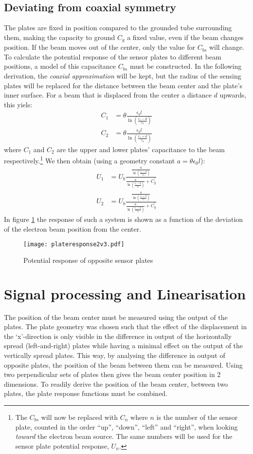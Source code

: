 \subsection{Deviating from coaxial symmetry}
The plates are fixed in position compared to the grounded tube surrounding them, making the capacity to ground $C_g$ a fixed value, even if the beam changes position. If the beam moves out of the center, only the value for $C_{bs}$ will change.
To calculate the potential response of the sensor plates to different beam positions, a model of this capacitance $C_{bs}$ must be constructed. 
In the following derivation, the \textit{coaxial approximation} will be kept, but the radius of the sensing plates will be replaced for the distance between the beam center and the plate's inner surface. For a beam that is displaced from the center a distance $d$ upwards, this yiels:
\begin{align}
C_1 &= \theta \frac{\epsilon_0l}{\ln\left(\frac{r_s-d}{r_b}\right)} \\
C_2 &= \theta \frac{\epsilon_0l}{\ln\left(\frac{r_s+d}{r_b}\right)}
\end{align}
where $C_1$ and $C_2$ are the upper and lower plates' capacitance to the beam respectively.\footnote{The $C_{bs}$ will now be replaced with $C_n$ where $n$ is the number of the sensor plate, counted in the order ``up'', ``down'', ``left'' and ``right'', when looking \textit{toward} the electron beam source. The same numbers will be used for the sensor plate potential response, $U_n$.}
We then obtain (using a geometry constant $a=\theta\epsilon_0l$):
\begin{align}
U_1 &= U_b\frac{\frac{a}{\ln\left(\frac{r_s-d}{r_b}\right)}}{\frac{a}{\ln\left(\frac{r_s-d}{r_b}\right)}+C_g^\prime} \\
U_2 &= U_b\frac{\frac{a}{\ln\left(\frac{r_s+d}{r_b}\right)}}{\frac{a}{\ln\left(\frac{r_s+d}{r_b}\right)}+C_g^\prime} \label{eq:plateresponse}
\end{align}
In figure \ref{fig:plateresponse} the response of such a system is shown as a function of the deviation of the electron beam position from the center.
\begin{figure}[hb!]
\centering
\texttt{[image: plateresponse2v3.pdf]}
\caption{Potential response of opposite sensor plates}
\label{fig:plateresponse}
\end{figure}

\newpage
\section{Signal processing and Linearisation}
The position of the beam center must be measured using the output of the plates. The plate geometry was chosen such that the effect of the displacement in the `x'-direction is only visible in the difference in output of the horizontally spread (left-and-right) plates while having a minimal effect on the output of the vertically spread plates. This way, by analysing the difference in output of opposite plates, the position of the beam between them can be measured. Using two perpendicular sets of plates then gives the beam center position in 2 dimensions. 
To readily derive the position of the beam center, between two plates, the plate response functions must be combined.
